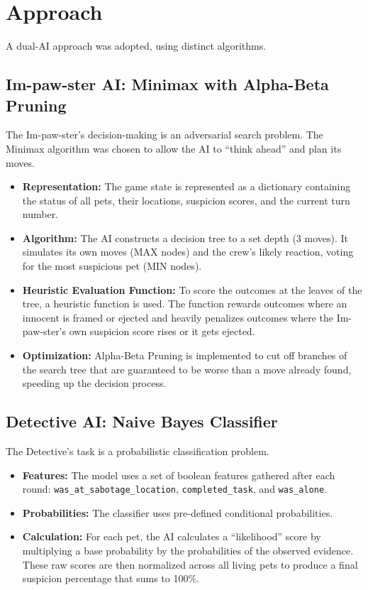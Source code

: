 \documentclass{article}
\begin{document}
\section{Approach}
A dual-AI approach was adopted, using distinct algorithms.

\subsection{Im-paw-ster AI: Minimax with Alpha-Beta Pruning}
The Im-paw-ster's decision-making is an adversarial search problem. The Minimax algorithm was chosen to allow the AI to ``think ahead'' and plan its moves.

\begin{itemize}
    \item \textbf{Representation:} The game state is represented as a dictionary containing the status of all pets, their locations, suspicion scores, and the current turn number.
    \item \textbf{Algorithm:} The AI constructs a decision tree to a set depth (3 moves). It simulates its own moves (MAX nodes) and the crew's likely reaction, voting for the most suspicious pet (MIN nodes).
    \item \textbf{Heuristic Evaluation Function:} To score the outcomes at the leaves of the tree, a heuristic function is used. The function rewards outcomes where an innocent is framed or ejected and heavily penalizes outcomes where the Im-paw-ster's own suspicion score rises or it gets ejected.
    \item \textbf{Optimization:} Alpha-Beta Pruning is implemented to cut off branches of the search tree that are guaranteed to be worse than a move already found, speeding up the decision process.
\end{itemize}

\subsection{Detective AI: Naive Bayes Classifier}
The Detective's task is a probabilistic classification problem.

\begin{itemize}
    \item \textbf{Features:} The model uses a set of boolean features gathered after each round: \texttt{was\_at\_sabotage\_location}, \texttt{completed\_task}, and \texttt{was\_alone}.
    \item \textbf{Probabilities:} The classifier uses pre-defined conditional probabilities.
    \item \textbf{Calculation:} For each pet, the AI calculates a ``likelihood'' score by multiplying a base probability by the probabilities of the observed evidence. These raw scores are then normalized across all living pets to produce a final suspicion percentage that sums to 100\%.
\end{itemize}
\end{document}
